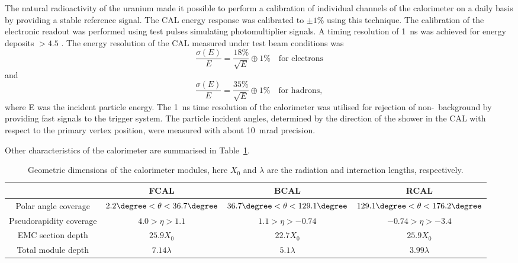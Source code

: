 The natural radioactivity of the uranium made it possible to perform a calibration of individual channels of the calorimeter on a daily basis by providing a stable reference signal. The CAL energy response was calibrated to $\pm 1\%$ using this technique. The calibration of the electronic readout was performed using test pulses simulating photomultiplier signals. A timing resolution of 1~ns was achieved for energy deposits $> 4.5$ \GeV.
The energy resolution of the CAL measured under test beam conditions was 
\begin{equation}
	\frac{\sigma \left(E\right)}{E} = \frac{18\%}{\sqrt{E}} \oplus 1\% \quad \text{for electrons}
\end{equation}
and 
\begin{equation}
	\frac{\sigma \left(E\right)}{E} = \frac{35\%}{\sqrt{E}} \oplus 1\% \quad \text{for hadrons},
\end{equation}
where E was the incident particle energy. The 1~ns time resolution of the calorimeter was utilised for rejection of non-\ep~background by providing fast signals to the trigger system. The particle incident angles, determined by the direction of the shower in the CAL with respect to the primary vertex position, were measured with about 10~mrad precision.

Other characteristics of the \zeus calorimeter are summarised in Table~\ref{tab:calparams}.

\begin{table}[htbp]
	\centering
	{\small
		\begin{tabular}{|c|c|c|c|}
			     \hline
      &FCAL & BCAL & RCAL \\
			\hline
			\hline
			Polar angle coverage & $2.2\degree < \theta < 36.7\degree$ & $36.7\degree < \theta < 129.1\degree$ & $129.1\degree < \theta < 176.2\degree$ \\ \hline
			Pseudorapidity coverage & $4.0 > \eta > 1.1$ & $1.1 > \eta > -0.74$ & $-0.74 > \eta > -3.4$ \\ \hline
			EMC section depth & $25.9 X_0$ & $22.7 X_0$ & $25.9 X_0$ \\ \hline
			Total module depth & $7.14 \lambda$ & $5.1 \lambda$ & $3.99 \lambda$ \\ \hline		
		\end{tabular}
	}
	\caption{Geometric dimensions of the calorimeter modules, here $X_0$ and $\lambda$ are the radiation and interaction lengths, respectively.}
	\label{tab:calparams}
\end{table}

